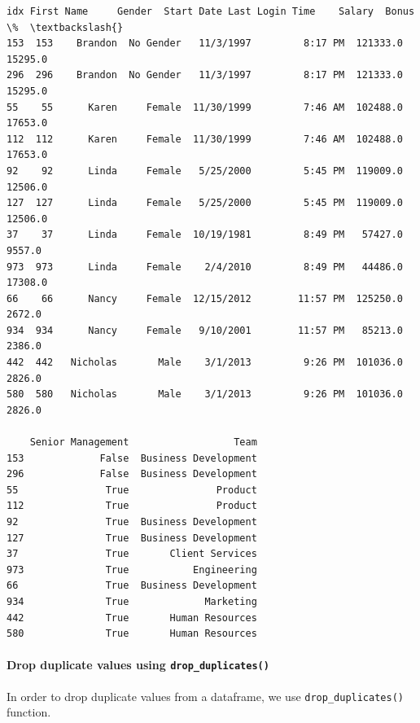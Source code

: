 \documentclass [oneside,10pt,a4paper,ngerman,BCOR10mm,headsepline,parindent,final]{scrartcl}
\makeatletter
\newcommand{\boxspacing}{\kern\kvtcb@left@rule\kern\kvtcb@boxsep}
\newcommand{\prompt}[4]{
        {\ttfamily\llap{{\color{#2}[#3]:\hspace{3pt}#4}}\vspace{-\baselineskip}}
    }
\makeatother
\begin{document}
            \begin{tcolorbox}[breakable, size=fbox, boxrule=.5pt, pad at break*=1mm, opacityfill=0]
\prompt{Out}{outcolor}{22}{\boxspacing}
\begin{Verbatim}[commandchars=\\\{\}]
     idx First Name     Gender  Start Date Last Login Time    Salary  Bonus \%  \textbackslash{}
153  153    Brandon  No Gender   11/3/1997         8:17 PM  121333.0  15295.0
296  296    Brandon  No Gender   11/3/1997         8:17 PM  121333.0  15295.0
55    55      Karen     Female  11/30/1999         7:46 AM  102488.0  17653.0
112  112      Karen     Female  11/30/1999         7:46 AM  102488.0  17653.0
92    92      Linda     Female   5/25/2000         5:45 PM  119009.0  12506.0
127  127      Linda     Female   5/25/2000         5:45 PM  119009.0  12506.0
37    37      Linda     Female  10/19/1981         8:49 PM   57427.0   9557.0
973  973      Linda     Female    2/4/2010         8:49 PM   44486.0  17308.0
66    66      Nancy     Female  12/15/2012        11:57 PM  125250.0   2672.0
934  934      Nancy     Female   9/10/2001        11:57 PM   85213.0   2386.0
442  442   Nicholas       Male    3/1/2013         9:26 PM  101036.0   2826.0
580  580   Nicholas       Male    3/1/2013         9:26 PM  101036.0   2826.0

    Senior Management                  Team
153             False  Business Development
296             False  Business Development
55               True               Product
112              True               Product
92               True  Business Development
127              True  Business Development
37               True       Client Services
973              True           Engineering
66               True  Business Development
934              True             Marketing
442              True       Human Resources
580              True       Human Resources
\end{Verbatim}
\end{tcolorbox}
        
    \hypertarget{drop-duplicate-values-using-drop_duplicates}{%
\paragraph{\texorpdfstring{Drop duplicate values using
\texttt{drop\_duplicates()}}{Drop duplicate values using drop\_duplicates()}}\label{drop-duplicate-values-using-drop_duplicates}}

In order to drop duplicate values from a dataframe, we use
\texttt{drop\_duplicates()} function.
\end{document}
